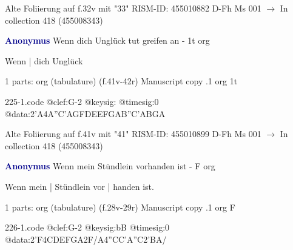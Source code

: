 \documentclass[twocolumn]{book}
\begin{document}
\newline Alte Foliierung auf f.32v mit "33"
\newline RISM-ID: 455010882
\newline D-Fh  Ms 001
\newline $\rightarrow$ In collection 418 (455008343)
      
\newline \par \vspace{7pt} \textcolor{darkblue}{\textbf{Anonymus  }}
\newline Wenn dich Unglück tut greifen an - 1t
\newline org
\newline \begin{itshape}[f.41v, at left:] Wenn | dich Unglück\end{itshape} 
\newline \textcolor{darkblue}{}  1 parts: org (tabulature)  (f.41v-42r)
\newline Manuscript copy
.1  org  1t  
\begin{filecontents*}{225-1.code}
@clef:G-2
@keysig:
@timesig:0
@data:2'A4A''C'AGFDEEFGAB''C'ABGA
\end{filecontents*}
\newline
%

\newline Alte Foliierung auf f.41v mit "41"
\newline RISM-ID: 455010899
\newline D-Fh  Ms 001
\newline $\rightarrow$ In collection 418 (455008343)
      
\newline \par \vspace{7pt} \textcolor{darkblue}{\textbf{Anonymus  }}
\newline Wenn mein Stündlein vorhanden ist - F
\newline org
\newline \begin{itshape}[f.28v, at left:] Wenn mein | Stündlein vor | handen ist.\end{itshape} 
\newline \textcolor{darkblue}{}  1 parts: org (tabulature)  (f.28v-29r)
\newline Manuscript copy
.1  org  F  
\begin{filecontents*}{226-1.code}
@clef:G-2
@keysig:bB
@timesig:0
@data:2'F4CDEFGA2F/A4''CC'A''C2'BA/
\end{filecontents*}
\newline
%
\end{document}
